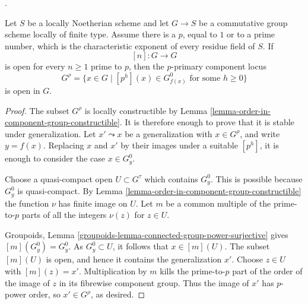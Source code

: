 \begin{lemma}
\label{lemma-primary-component-locus-open}
\begin{reference}
\cite[Expos\'e 236, Theorem 1.1(iv), pp. 224 and 227]{FGA}.
\end{reference}
Let $S$ be a locally Noetherian scheme and let $G \to S$ be a commutative
group scheme locally of finite type. Assume there is a $p$, equal to $1$ or
to a prime number, which is the characteristic exponent of every residue
field of $S$. If
$$
[n] : G \longrightarrow G
$$
is open for every $n \geq 1$ prime to $p$, then the $p$-primary
component locus
$$
G^\rho = \{x \in G \mid [p^h](x) \in G_{f(x)}^0
\text{ for some }h \geq 0\}
$$
is open in $G$.
\end{lemma}

\begin{proof}
The subset $G^\rho$ is locally constructible by
Lemma \ref{lemma-order-in-component-group-constructible}. It is therefore
enough to prove that it is stable under generalization. Let $x' \leadsto x$
be a generalization with $x \in G^\rho$, and write $y=f(x)$. Replacing
$x$ and $x'$ by their images under a suitable $[p^h]$, it is enough to
consider the case $x \in G_y^0$.

Choose a quasi-compact open $U \subset G^\tau$ which contains $G_y^0$.
This is possible because $G_y^0$ is quasi-compact. By
Lemma \ref{lemma-order-in-component-group-constructible} the function
$\nu$ has finite image on $U$. Let $m$ be a common multiple of the
prime-to-$p$ parts of all the integers $\nu(z)$ for $z \in U$.

Groupoids, Lemma
\ref{groupoids-lemma-connected-group-power-surjective} gives
$[m](G_y^0)=G_y^0$. As $G_y^0 \subset U$, it follows that
$x \in [m](U)$. The subset $[m](U)$ is open, and hence it contains the
generalization $x'$. Choose $z \in U$ with $[m](z)=x'$. Multiplication by
$m$ kills the prime-to-$p$ part of the order of the image of $z$ in its
fibrewise component group. Thus the image of $x'$ has $p$-power order, so
$x' \in G^\rho$, as desired.
\end{proof}

